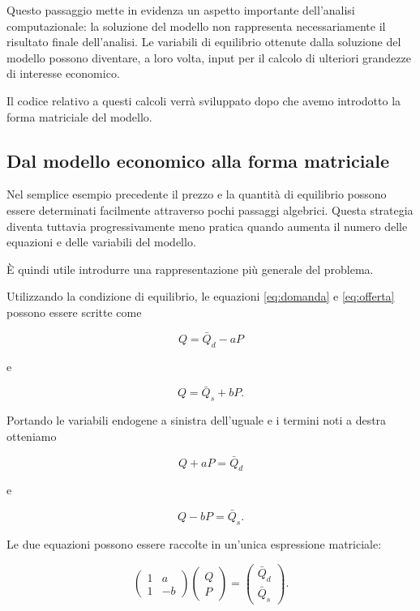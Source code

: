 Questo passaggio mette in evidenza un aspetto importante
dell'analisi computazionale: la soluzione del modello non
rappresenta necessariamente il risultato finale dell'analisi.
Le variabili di equilibrio ottenute dalla soluzione del modello
possono diventare, a loro volta, input per il calcolo di ulteriori
grandezze di interesse economico.

Il codice relativo a questi calcoli verrà sviluppato dopo che avemo introdotto la forma matriciale del modello.

\subsection{Dal modello economico alla forma matriciale}

Nel semplice esempio precedente il prezzo e la quantità di equilibrio
possono essere determinati facilmente attraverso pochi passaggi
algebrici. Questa strategia diventa tuttavia progressivamente meno
pratica quando aumenta il numero delle equazioni e delle variabili
del modello.

È quindi utile introdurre una rappresentazione più generale del
problema.

Utilizzando la condizione di equilibrio, le equazioni
\eqref{eq:domanda} e \eqref{eq:offerta} possono essere scritte come

\begin{equation*}
    Q = \bar{Q}_d - aP
\end{equation*}

e

\begin{equation*}
    Q = \bar{Q}_s + bP.
\end{equation*}

Portando le variabili endogene a sinistra dell'uguale e i termini noti a destra
otteniamo

\begin{equation*}
    Q + aP = \bar{Q}_d
\end{equation*}

e

\begin{equation*}
    Q - bP = \bar{Q}_s.
\end{equation*}

Le due equazioni possono essere raccolte in un'unica espressione
matriciale:

\begin{equation*}
    \begin{pmatrix}
        1 & a \\
        1 & -b
    \end{pmatrix}
    \begin{pmatrix}
        Q \\
        P
    \end{pmatrix}
    =
    \begin{pmatrix}
        \bar{Q}_d \\
        \bar{Q}_s
    \end{pmatrix}.
    \label{eq:domanda_offerta_matrice}
\end{equation*}

